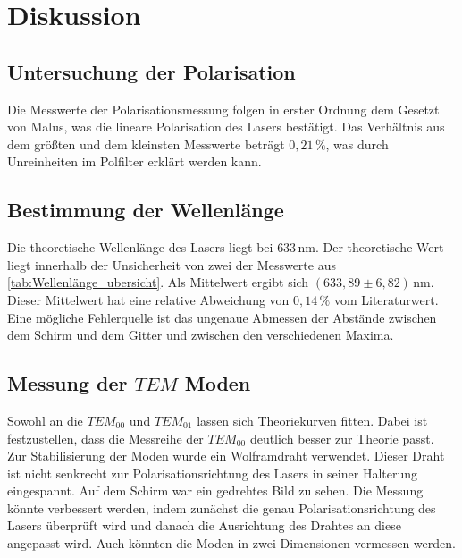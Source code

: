 \section{Diskussion}
\label{sec:Diskussion}



\subsection{Untersuchung der Polarisation}
\label{sec:Polarisation}

Die Messwerte der Polarisationsmessung folgen in erster Ordnung dem Gesetzt von Malus, was die lineare Polarisation des Lasers bestätigt.
Das Verhältnis aus dem größten und dem kleinsten Messwerte beträgt $0,21 \,\% $, was durch Unreinheiten im Polfilter erklärt werden kann.

\subsection{Bestimmung der Wellenlänge}
\label{sec:Wellenlänge}

Die theoretische Wellenlänge des Lasers liegt bei $633 \,\unit{\nano\meter}$\cite{eicheich}. Der theoretische Wert liegt innerhalb der Unsicherheit von zwei der Messwerte aus \autoref{tab:Wellenlänge_ubersicht}.
Als Mittelwert ergibt sich $ \left( 633,89 \pm 6,82 \right) \,\unit{\nano\meter}$. Dieser Mittelwert hat eine relative Abweichung von $ 0,14 \,\% $ vom Literaturwert.
Eine mögliche Fehlerquelle ist das ungenaue Abmessen der Abstände zwischen dem Schirm und dem Gitter und zwischen den verschiedenen Maxima. 


\subsection{Messung der $TEM$ Moden}
\label{sec:TEM_moden}
Sowohl an die $TEM_{00}$ und $TEM_{01}$ lassen sich Theoriekurven fitten. Dabei ist festzustellen, dass die Messreihe der $TEM_{00}$ deutlich besser zur Theorie passt.
Zur Stabilisierung der Moden wurde ein Wolframdraht verwendet. Dieser Draht ist nicht senkrecht zur Polarisationsrichtung des Lasers in seiner Halterung eingespannt.
Auf dem Schirm war ein gedrehtes Bild zu sehen. Die Messung könnte verbessert werden, indem zunächst die genau Polarisationsrichtung des Lasers überprüft wird und danach die Ausrichtung des Drahtes an diese angepasst wird.    
Auch könnten die Moden in zwei Dimensionen vermessen werden.

